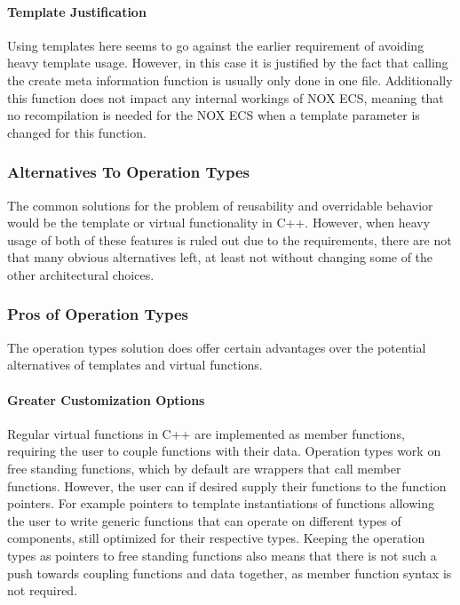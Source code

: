 

\paragraph{Template Justification}
Using templates here seems to go against the earlier requirement of avoiding heavy template usage.
However, in this case it is justified by the fact that calling the create meta information function is usually only done in one file.
Additionally this function does not impact any internal workings of NOX ECS, meaning that no recompilation is needed for the NOX ECS when
a template parameter is changed for this function.

\subsubsection{Alternatives To Operation Types}
The common solutions for the problem of reusability and overridable behavior would be the template or virtual functionality in C++.
However, when heavy usage of both of these features is ruled out due to the requirements, there are not that many obvious alternatives left, at least not without changing some of the other architectural choices.

\subsubsection{Pros of Operation Types}
The operation types solution does offer certain advantages over the potential alternatives of templates and virtual functions.

\paragraph{Greater Customization Options}
Regular virtual functions in C++ are implemented as member functions, requiring the user to couple functions with their data.
Operation types work on free standing functions, which by default are wrappers that call member functions.
However, the user can if desired supply their functions to the function pointers. 
For example pointers to template instantiations of functions allowing the user to write generic functions that can operate on different types of components, still optimized for their respective types.
Keeping the operation types as pointers to free standing functions also means that there is not such a push towards coupling functions and data together, as member function syntax is not required.

